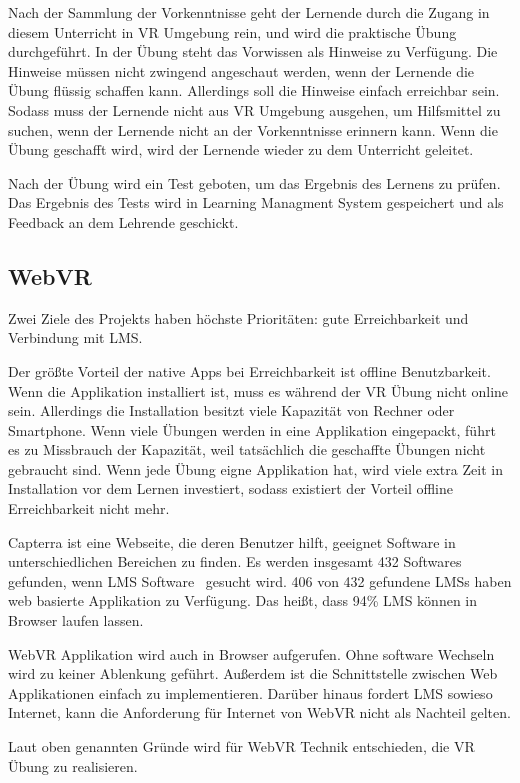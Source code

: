  Nach der Sammlung der Vorkenntnisse geht der Lernende durch die Zugang in diesem Unterricht in VR Umgebung rein, und wird die praktische Übung durchgeführt. In der Übung steht das Vorwissen als Hinweise zu Verfügung. Die Hinweise müssen nicht zwingend angeschaut werden, wenn der Lernende die Übung flüssig schaffen kann. Allerdings soll die Hinweise einfach erreichbar sein. Sodass muss der Lernende nicht aus VR Umgebung ausgehen, um Hilfsmittel zu suchen, wenn der Lernende nicht an der Vorkenntnisse erinnern kann. Wenn die Übung geschafft wird, wird der Lernende wieder zu dem Unterricht geleitet.

 Nach der Übung wird ein Test geboten, um das Ergebnis des Lernens zu prüfen. Das Ergebnis des Tests wird in Learning Managment System gespeichert und als Feedback an dem Lehrende geschickt.

 \subsection{WebVR}
 Zwei Ziele des Projekts haben höchste Prioritäten: gute Erreichbarkeit und Verbindung mit LMS.

 Der größte Vorteil der native Apps bei Erreichbarkeit ist offline Benutzbarkeit. Wenn die Applikation installiert ist, muss es während der VR Übung nicht online sein. Allerdings die Installation besitzt viele Kapazität von Rechner oder Smartphone. Wenn viele Übungen werden in eine Applikation eingepackt, führt es zu Missbrauch der Kapazität, weil tatsächlich die geschaffte Übungen nicht gebraucht sind. Wenn jede Übung eigne Applikation hat, wird viele extra Zeit in Installation vor dem Lernen investiert, sodass existiert der Vorteil offline Erreichbarkeit nicht mehr.

 Capterra ist eine Webseite, die deren Benutzer hilft, geeignet Software in unterschiedlichen Bereichen zu finden. Es werden insgesamt 432 Softwares gefunden, wenn \glqq LMS Software \grqq\ gesucht wird. 406 von 432 gefundene LMSs haben web basierte Applikation zu Verfügung. Das heißt, dass 94\% LMS können in Browser laufen lassen.

 WebVR Applikation wird auch in Browser aufgerufen. Ohne software Wechseln wird zu keiner Ablenkung geführt. Außerdem ist die Schnittstelle zwischen Web Applikationen einfach zu implementieren. Darüber hinaus fordert LMS sowieso Internet, kann die Anforderung für Internet von WebVR nicht als Nachteil gelten. 

 Laut oben genannten Gründe wird für WebVR Technik entschieden, die VR Übung zu realisieren.

